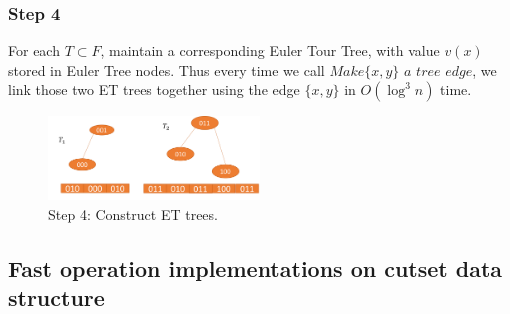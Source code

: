 \documentclass[conference,compsoc]{IEEEtran}
\begin{document}
\subsubsection*{Step 4} For each $T \subset F$, maintain a corresponding Euler Tour Tree, with value $v(x)$ stored in Euler Tree nodes. Thus every time we call $Make\{x,y\}$ $a$ $tree$ $edge$, we link those two ET trees together using the edge $\{x,y\}$ in $O(\log^3n)$ time.
\begin{figure}[h]
	\centering
	\includegraphics[width=0.5\textwidth]{Pic/4.png}
	\caption{Step 4: Construct ET trees.}
	\label{fig:4}
\end{figure}
\subsection{Fast operation implementations on cutset data structure}
\end{document}
